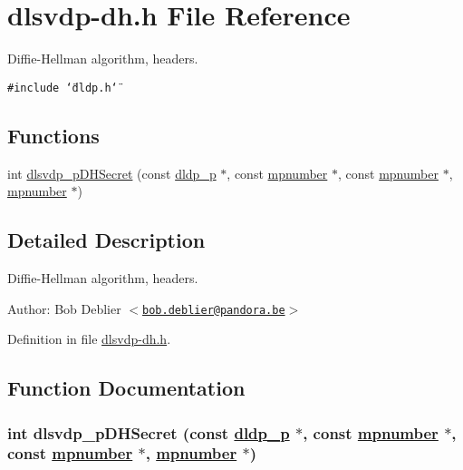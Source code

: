 \hypertarget{dlsvdp-dh_8h}{
\section{dlsvdp-dh.h File Reference}
\label{dlsvdp-dh_8h}
}
Diffie-Hellman algorithm, headers. 

{\tt \#include \char`\"{}dldp.h\char`\"{}}\par
\subsection*{Functions}
\begin{CompactItemize}
\item 
int \hyperlink{dlsvdp-dh_8h_a0}{dlsvdp\_\-p\-DHSecret} (const \hyperlink{structdldp__p}{dldp\_\-p} $\ast$, const \hyperlink{structmpnumber}{mpnumber} $\ast$, const \hyperlink{structmpnumber}{mpnumber} $\ast$, \hyperlink{structmpnumber}{mpnumber} $\ast$)
\end{CompactItemize}


\subsection{Detailed Description}
Diffie-Hellman algorithm, headers. 

\begin{Desc}
\item[Author:]Bob Deblier $<$\href{mailto:bob.deblier@pandora.be}{\tt bob.deblier@pandora.be}$>$\end{Desc}


Definition in file \hyperlink{dlsvdp-dh_8h-source}{dlsvdp-dh.h}.

\subsection{Function Documentation}
\hypertarget{dlsvdp-dh_8h_a0}{
\subsubsection[dlsvdp\_\-pDHSecret]{\setlength{\rightskip}{0pt plus 5cm}int dlsvdp\_\-p\-DHSecret (const \hyperlink{structdldp__p}{dldp\_\-p} $\ast$, const \hyperlink{structmpnumber}{mpnumber} $\ast$, const \hyperlink{structmpnumber}{mpnumber} $\ast$, \hyperlink{structmpnumber}{mpnumber} $\ast$)}}
\label{dlsvdp-dh_8h_a0}


